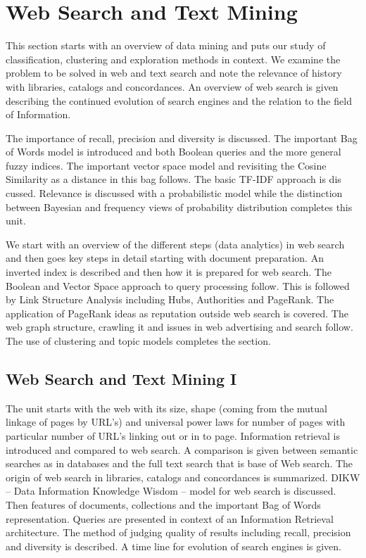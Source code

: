 \chapter{Web Search and Text Mining}\label{web-search-and-text-mining}

\FILENAME

This section starts with an overview of data mining and puts our study
of classification, clustering and exploration methods in context. We
examine the problem to be solved in web and text search and note the
relevance of history with libraries, catalogs and concordances. An
overview of web search is given describing the continued evolution of
search engines and the relation to the field of Information.

The importance of recall, precision and diversity is discussed. The
important Bag of Words model is introduced and both Boolean queries and
the more general fuzzy indices. The important vector space model and
revisiting the Cosine Similarity as a distance in this bag follows. The
basic TF-IDF approach is dis cussed. Relevance is discussed with a
probabilistic model while the distinction between Bayesian and frequency
views of probability distribution completes this unit.

We start with an overview of the different steps (data analytics) in web
search and then goes key steps in detail starting with document
preparation. An inverted index is described and then how it is prepared
for web search. The Boolean and Vector Space approach to query
processing follow. This is followed by Link Structure Analysis including
Hubs, Authorities and PageRank. The application of PageRank ideas as
reputation outside web search is covered. The web graph structure,
crawling it and issues in web advertising and search follow. The use of
clustering and topic models completes the section.

\section{Web Search and Text Mining I}\label{web-search-and-text-mining-i}

The unit starts with the web with its size, shape (coming from the
mutual linkage of pages by URL's) and universal power laws for number of
pages with particular number of URL's linking out or in to page.
Information retrieval is introduced and compared to web search. A
comparison is given between semantic searches as in databases and the
full text search that is base of Web search. The origin of web search in
libraries, catalogs and concordances is summarized. DIKW -- Data
Information Knowledge Wisdom -- model for web search is discussed. Then
features of documents, collections and the important Bag of Words
representation. Queries are presented in context of an Information
Retrieval architecture. The method of judging quality of results
including recall, precision and diversity is described. A time line for
evolution of search engines is given.

